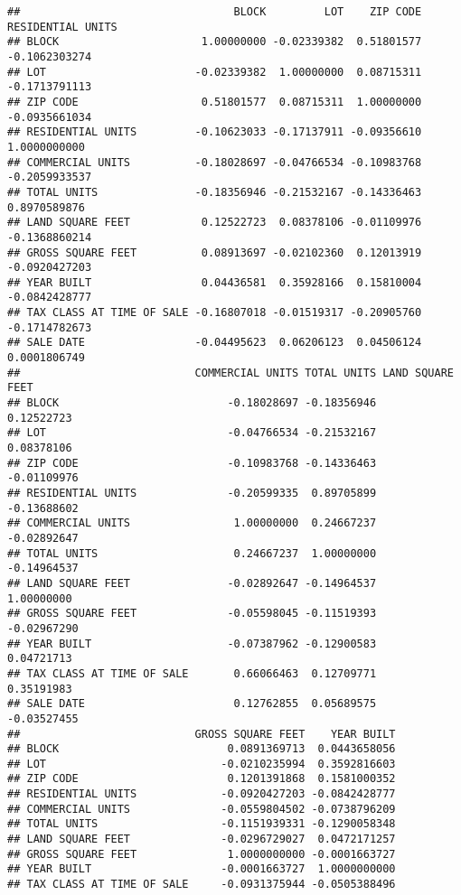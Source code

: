\documentclass[
]{article}
\begin{document}
\begin{verbatim}
##                                 BLOCK         LOT    ZIP CODE RESIDENTIAL UNITS
## BLOCK                      1.00000000 -0.02339382  0.51801577     -0.1062303274
## LOT                       -0.02339382  1.00000000  0.08715311     -0.1713791113
## ZIP CODE                   0.51801577  0.08715311  1.00000000     -0.0935661034
## RESIDENTIAL UNITS         -0.10623033 -0.17137911 -0.09356610      1.0000000000
## COMMERCIAL UNITS          -0.18028697 -0.04766534 -0.10983768     -0.2059933537
## TOTAL UNITS               -0.18356946 -0.21532167 -0.14336463      0.8970589876
## LAND SQUARE FEET           0.12522723  0.08378106 -0.01109976     -0.1368860214
## GROSS SQUARE FEET          0.08913697 -0.02102360  0.12013919     -0.0920427203
## YEAR BUILT                 0.04436581  0.35928166  0.15810004     -0.0842428777
## TAX CLASS AT TIME OF SALE -0.16807018 -0.01519317 -0.20905760     -0.1714782673
## SALE DATE                 -0.04495623  0.06206123  0.04506124      0.0001806749
##                           COMMERCIAL UNITS TOTAL UNITS LAND SQUARE FEET
## BLOCK                          -0.18028697 -0.18356946       0.12522723
## LOT                            -0.04766534 -0.21532167       0.08378106
## ZIP CODE                       -0.10983768 -0.14336463      -0.01109976
## RESIDENTIAL UNITS              -0.20599335  0.89705899      -0.13688602
## COMMERCIAL UNITS                1.00000000  0.24667237      -0.02892647
## TOTAL UNITS                     0.24667237  1.00000000      -0.14964537
## LAND SQUARE FEET               -0.02892647 -0.14964537       1.00000000
## GROSS SQUARE FEET              -0.05598045 -0.11519393      -0.02967290
## YEAR BUILT                     -0.07387962 -0.12900583       0.04721713
## TAX CLASS AT TIME OF SALE       0.66066463  0.12709771       0.35191983
## SALE DATE                       0.12762855  0.05689575      -0.03527455
##                           GROSS SQUARE FEET    YEAR BUILT
## BLOCK                          0.0891369713  0.0443658056
## LOT                           -0.0210235994  0.3592816603
## ZIP CODE                       0.1201391868  0.1581000352
## RESIDENTIAL UNITS             -0.0920427203 -0.0842428777
## COMMERCIAL UNITS              -0.0559804502 -0.0738796209
## TOTAL UNITS                   -0.1151939331 -0.1290058348
## LAND SQUARE FEET              -0.0296729027  0.0472171257
## GROSS SQUARE FEET              1.0000000000 -0.0001663727
## YEAR BUILT                    -0.0001663727  1.0000000000
## TAX CLASS AT TIME OF SALE     -0.0931375944 -0.0505388496

\end{verbatim}
\end{document}
